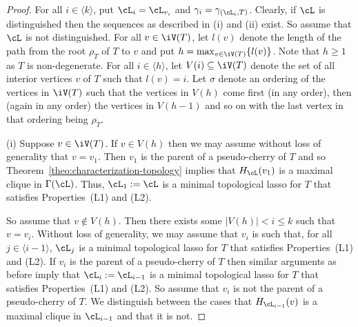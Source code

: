 \begin{proof}
  For all $i\in \langle k\rangle$, put $\cL_i=\cL_{v_{i}}$ and
  $\gamma_i=\gamma_{(\cL_i,T)}$.  Clearly, if $\cL$ is distinguished then the
  sequences as described in (i) and (ii) exist. So assume that $\cL$ is not
  distinguished.  For all $v\in \iV(T)$, let $l(v)$ denote the length of the
  path from the root $\rho_T$ of $T$ to $v$ and put $h=\max_{v\in
    \iV(T)}\{l(v)\}$.  Note that $h\geq 1$ as $T$ is non-degenerate.  For all
  $i\in \langle h\rangle$, let $V(i)\subseteq \iV(T)$ denote the set of all
  interior vertices $v$ of $T$ such that $l(v)=i$.  Let $\sigma$ denote an
  ordering of the vertices in $\iV(T)$ such that the vertices in $V(h)$ come
  first (in any order), then (again in any order) the vertices in $V(h-1)$ and
  so on with the last vertex in that ordering being $\rho_T$.

  (i) Suppose $v\in \iV(T)$. If $v\in V(h)$ then
  we may assume without loss of generality that $v=v_1$. Then $v_1$ is the
  parent of a pseudo-cherry of $T$ and so
  Theorem~\ref{theo:characterization-topology} implies that $H_{\cL}(v_1)$ is
  a maximal clique in $\Gamma(\cL)$. Thus, $\cL_1:=\cL$ is a minimal
  topological lasso for $T$ that satisfies Properties~(L1) and (L2).

  So assume that $v\not\in V(h)$. Then there exists some $|V(h)|< i\leq k$
  such that $v=v_i$. Without loss of generality, we may assume that $v_i$ is
  such that, for all $j\in \langle i-1\rangle$, $\cL_j$ is a minimal
  topological lasso for $T$ that satisfies Properties~(L1) and (L2).  If $v_i$
  is the parent of a pseudo-cherry of $T$ then similar arguments as before
  imply that $\cL_i:=\cL_{i-1}$ is a minimal topological lasso for $T$ that
  satisfies Properties~(L1) and (L2). So assume that $v_i$ is not the parent
  of a pseudo-cherry of $T$.
  We distinguish between the cases that $H_{\cL_{i-1}}(v)$ is a maximal clique
  in $\cL_{i-1}$ and that it is not.


\end{proof}

